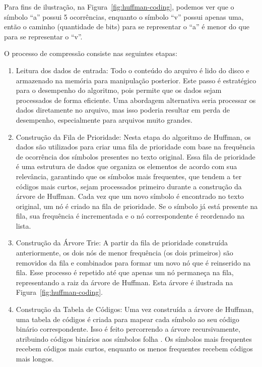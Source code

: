 Para fins de ilustração, na Figura~\ref{fig:huffman-coding}, podemos ver que o símbolo ``a'' possui 5 ocorrências, enquanto o símbolo ``v'' possui apenas uma, então o caminho (quantidade de bits) para se representar o ``a'' é menor do que para se representar o ``v''.

O processo de compressão consiste nas seguintes etapas:
\begin{enumerate}
    \item Leitura dos dados de entrada:
    \BlankLine
    Todo o conteúdo do arquivo é lido do disco e armazenado na memória para manipulação posterior. Este passo é estratégico para o desempenho do algoritmo, pois permite que os dados sejam processados de forma eficiente. Uma abordagem alternativa seria processar os dados diretamente no arquivo, mas isso poderia resultar em perda de desempenho, especialmente para arquivos muito grandes.
    
    \item Construção da Fila de Prioridade:
    \BlankLine
    Nesta etapa do algoritmo de Huffman, os dados são utilizados para criar uma fila de prioridade com base na frequência de ocorrência dos símbolos presentes no texto original. Essa fila de prioridade é uma estrutura de dados que organiza os elementos de acordo com sua relevância, garantindo que os símbolos mais frequentes, que tendem a ter códigos mais curtos, sejam processados primeiro durante a construção da árvore de Huffman. Cada vez que um novo símbolo é encontrado no texto original, um nó é criado na fila de prioridade. Se o símbolo já está presente na fila, sua frequência é incrementada e o nó correspondente é reordenado na lista.

    \item Construção da Árvore Trie:
    \BlankLine
    A partir da fila de prioridade construída anteriormente, os dois nós de menor frequência (os dois primeiros) são removidos da fila e combinados para formar um novo nó que é reinserido na fila. Esse processo é repetido até que apenas um nó permaneça na fila, representando a raiz da árvore de Huffman. Esta árvore é ilustrada na Figura~\ref{fig:huffman-coding}.

    \item Construção da Tabela de Códigos:
    \BlankLine
    Uma vez construída a árvore de Huffman, uma tabela de códigos é criada para mapear cada símbolo ao seu código binário correspondente. Isso é feito percorrendo a árvore recursivamente, atribuindo códigos binários aos símbolos folha \cite{imeUspBinaryTrees}. Os símbolos mais frequentes recebem códigos mais curtos, enquanto os menos frequentes recebem códigos mais longos.


\end{enumerate}
